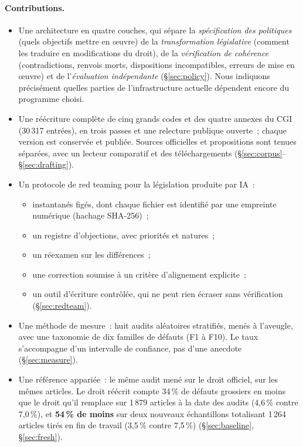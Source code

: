 \documentclass[11pt,a4paper]{article}
\begin{document}
\paragraph{Contributions.}
\begin{itemize}
  \item Une architecture en quatre couches, qui sépare la \emph{spécification des politiques} (quels objectifs mettre en \oe{}uvre) de la \emph{transformation législative} (comment les traduire en modifications du droit), de la \emph{vérification de cohérence} (contradictions, renvois morts, dispositions incompatibles, erreurs de mise en \oe{}uvre) et de l'\emph{évaluation indépendante} (\S\ref{sec:policy}). Nous indiquons précisément quelles parties de l'infrastructure actuelle dépendent encore du programme choisi.
  \item Une réécriture complète de cinq grands codes et des quatre annexes du CGI (30\,317 entrées), en trois passes et une relecture publique ouverte~; chaque version est conservée et publiée. Sources officielles et propositions sont tenues séparées, avec un lecteur comparatif et des téléchargements (\S\ref{sec:corpus}--\S\ref{sec:drafting}).
  \item Un protocole de \og red teaming \fg{} pour la législation produite par IA~:
  \begin{itemize}
    \item instantanés figés, dont chaque fichier est identifié par une empreinte numérique (hachage SHA-256)~;
    \item un registre d'objections, avec priorités et natures~;
    \item un réexamen sur les différences~;
    \item une correction soumise à un critère d'alignement explicite~;
    \item un outil d'écriture contrôlée, qui ne peut rien écraser sans vérification (\S\ref{sec:redteam}).
  \end{itemize}
  \item Une méthode de mesure~: huit audits aléatoires stratifiés, menés à l'aveugle, avec une taxonomie de dix familles de défauts (F1 à F10). Le taux s'accompagne d'un intervalle de confiance, pas d'une anecdote (\S\ref{sec:measure}).
  \item Une référence appariée~: le même audit mené sur le droit officiel, sur les mêmes articles. Le droit réécrit compte 34\,\% de défauts grossiers en moins que le droit qu'il remplace sur 1\,879 articles à la date des audits (4,6\,\% contre 7,0\,\%), et \textbf{54\,\% de moins} sur deux nouveaux échantillons totalisant 1\,264 articles tirés en fin de travail (3,5\,\% contre 7,5\,\%) (\S\ref{sec:baseline}, \S\ref{sec:fresh}).

\end{itemize}
\end{document}
